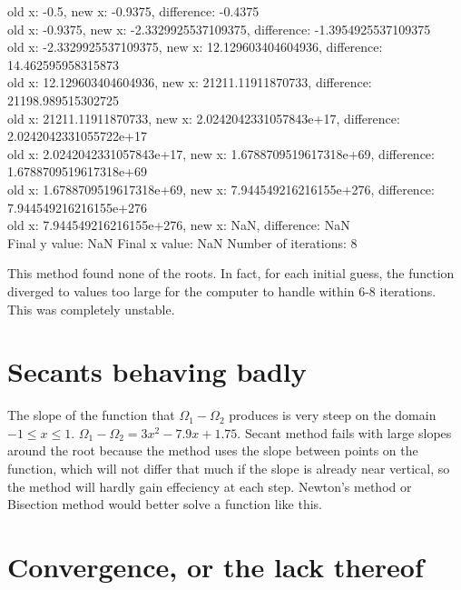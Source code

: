 \documentclass[12pt]{article}
\begin{document}
\begin{enumerate}
\begin{footnotesize}
\begin{spacing}{-.8}
old x: -0.5, new x: -0.9375, difference: -0.4375\\
old x: -0.9375, new x: -2.3329925537109375, difference: -1.3954925537109375\\
old x: -2.3329925537109375, new x: 12.129603404604936, difference: 14.462595958315873\\
old x: 12.129603404604936, new x: 21211.11911870733, difference: 21198.989515302725\\
old x: 21211.11911870733, new x: 2.0242042331057843e+17, difference: 2.0242042331055722e+17\\
old x: 2.0242042331057843e+17, new x: 1.6788709519617318e+69, difference: 1.6788709519617318e+69\\
old x: 1.6788709519617318e+69, new x: 7.944549216216155e+276, difference: 7.944549216216155e+276\\
old x: 7.944549216216155e+276, new x: NaN, difference: NaN\\
Final y value: NaN
Final x value: NaN
Number of iterations: 8
\end{spacing}
\end{footnotesize}
\vspace{.4in}

This method found none of the roots.  In fact, for each initial guess, the function diverged to values too large for the computer to handle within 6-8 iterations.  This was completely unstable.

\end{enumerate}

\section{Secants behaving badly}

The slope of the function that $\Omega_1-\Omega_2$ produces is very steep on the domain $-1\leq x \leq 1$.  $\Omega_1-\Omega_2 = 3x^2-7.9x+1.75$.  Secant method fails with large slopes around the root because the method uses the slope between points on the function, which will not differ that much if the slope is already near vertical, so the method will hardly gain effeciency at each step.  Newton's method or Bisection method would better solve a function like this.

\section{Convergence, or the lack thereof}
\end{document}
